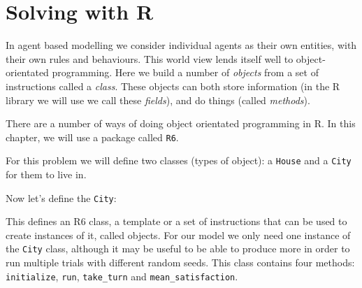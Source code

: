 \section{Solving with R}\label{sec:solving-with-R}
In agent based modelling we consider individual agents as their own entities,
with their own rules and behaviours.
This world view lends itself well to object-orientated programming.
Here we build a number of \textit{objects} from a set of instructions called a
\textit{class}.
These objects can both store information (in the R library we will use we call
these \textit{fields}), and do things (called \textit{methods}).

There are a number of ways of doing object orientated programming in R.
In this chapter, we will use a package called \texttt{R6}.

For this problem we will define two classes (types of object): a
\texttt{House} and a \texttt{City} for them to live in.

Now let's define the \texttt{City}:


This defines an R6 class, a template or a set of instructions that can be used
to create instances of it, called objects.
For our model we only need one instance of the \texttt{City} class,
although it may be useful to be able to produce more in order to run multiple
trials with different random seeds.
This class contains four methods: \texttt{initialize},
\texttt{run}, \texttt{take_turn} and
\texttt{mean_satisfaction}.

